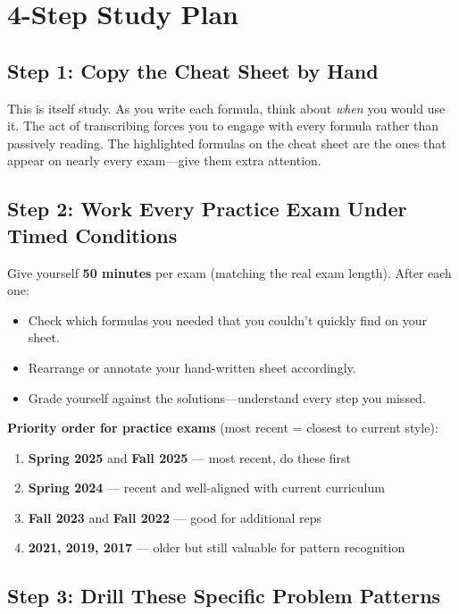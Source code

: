 \documentclass[11pt]{article}
\begin{document}
\vspace{8pt}

\section{4-Step Study Plan}

\subsection{Step 1: Copy the Cheat Sheet by Hand}

This is itself study. As you write each formula, think about \emph{when} you would use it. The act of transcribing forces you to engage with every formula rather than passively reading. The highlighted formulas on the cheat sheet are the ones that appear on nearly every exam---give them extra attention.

\subsection{Step 2: Work Every Practice Exam Under Timed Conditions}

Give yourself \textbf{50 minutes} per exam (matching the real exam length). After each one:
\begin{itemize}
\item Check which formulas you needed that you couldn't quickly find on your sheet.
\item Rearrange or annotate your hand-written sheet accordingly.
\item Grade yourself against the solutions---understand every step you missed.
\end{itemize}

\textbf{Priority order for practice exams} (most recent = closest to current style):
\begin{enumerate}
\item \textbf{Spring 2025} and \textbf{Fall 2025} --- most recent, do these first
\item \textbf{Spring 2024} --- recent and well-aligned with current curriculum
\item \textbf{Fall 2023} and \textbf{Fall 2022} --- good for additional reps
\item \textbf{2021, 2019, 2017} --- older but still valuable for pattern recognition
\end{enumerate}

\subsection{Step 3: Drill These Specific Problem Patterns}
\end{document}
